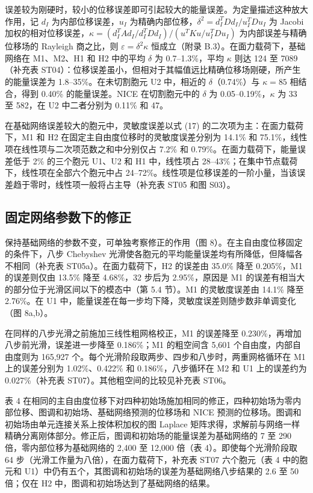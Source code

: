 \documentclass[preprint,12pt,authoryear]{elsarticle}
\begin{document}
误差较为刚硬时，较小的位移误差即可引起较大的能量误差。为定量描述这种放大作用，记 \(d_I\) 为内部位移误差，\(u_I\) 为精确内部位移，\(\delta^2=d_I^TDd_I/u_I^TDu_I\) 为 Jacobi 加权的相对位移误差，\(\kappa=(d_I^TAd_I/d_I^TDd_I)/(u^TKu/u_I^TDu_I)\) 为内部误差与精确位移场的 Rayleigh 商之比，则 \(\varepsilon=\delta^2\kappa\) 恒成立（附录 B.3）。在面力载荷下，基础网络在 M1、M2、H1 和 H2 中的平均 \(\delta\) 为 0.7--1.3\%，平均 \(\kappa\) 则达 124 至 7089（补充表 ST04）：位移误差虽小，但相对于其幅值远比精确位移场刚硬，所产生的能量误差为 1.8--35\%。在未切割胞元 U2 中，相近的 \(\delta\)（0.74\%）与 \(\kappa=85\) 相结合，得到 0.40\% 的能量误差。NICE 在切割胞元中的 \(\delta\) 为 0.05--0.19\%，\(\kappa\) 为 33 至 582，在 U2 中二者分别为 0.11\% 和 47。

在基础网络误差较大的胞元中，灵敏度误差以式 (17) 的二次项为主：在面力载荷下，M1 和 H2 在固定主自由度位移时的灵敏度误差分别为 14.1\% 和 75.1\%，线性项在线性项与二次项范数之和中分别仅占 7.2\% 和 0.79\%。在面力载荷下，能量误差低于 2\% 的三个胞元 U1、U2 和 H1 中，线性项占 28--43\%；在集中节点载荷下，线性项在全部六个胞元中占 24--72\%。线性项是位移误差的一阶小量，当该误差趋于零时，线性项一般将占主导（补充表 ST05 和图 S03）。

\subsection{固定网络参数下的修正}

保持基础网络的参数不变，可单独考察修正的作用（图 8）。在主自由度位移固定的条件下，八步 Chebyshev 光滑使各胞元的平均能量误差均有所降低，但降幅各不相同（补充表 ST05a）。在面力载荷下，H2 的误差由 35.0\% 降至 0.205\%，M1 的误差则仅由 13.5\% 降至 4.68\%，32 步后为 2.95\%，原因是 M1 的误差有相当大的部分位于光滑区间以下的模态中（第 5.4 节）。M1 的灵敏度误差由 14.1\% 降至 2.76\%。在 U1 中，能量误差在每一步均下降，灵敏度误差则随步数非单调变化（图 8a,b）。

在同样的八步光滑之前施加三线性粗网格校正，M1 的误差降至 0.230\%，再增加八步前光滑，误差进一步降至 0.186\%；M1 的粗空间含 5,601 个自由度，内部自由度则为 165,927 个。每个光滑阶段取两步、四步和八步时，两重网格循环在 M1 上的误差分别为 1.02\%、0.422\% 和 0.186\%，八步循环在 M2 和 U1 上的误差约为 0.027\%（补充表 ST07）。其他粗空间的比较见补充表 ST06。

表 4 在相同的主自由度位移下对四种初始场施加相同的修正，四种初始场为零内部位移、图调和初始场、基础网络预测的位移场和 NICE 预测的位移场。图调和初始场由单元连接关系上按体积加权的图 Laplace 矩阵求得，求解前与网络一样精确分离刚体部分。修正后，图调和初始场的能量误差为基础网络的 7 至 290 倍，零内部位移为基础网络的 2,400 至 12,000 倍（表 4）。即使每个光滑阶段取 64 步（光滑工作量为八倍），在面力载荷下，补充表 ST07 六个胞元（表 4 中的胞元和 U1）中仍有五个，其图调和初始场的误差为基础网络八步结果的 2.6 至 50 倍；仅在 H2 中，图调和初始场达到了基础网络的结果。
\end{document}
